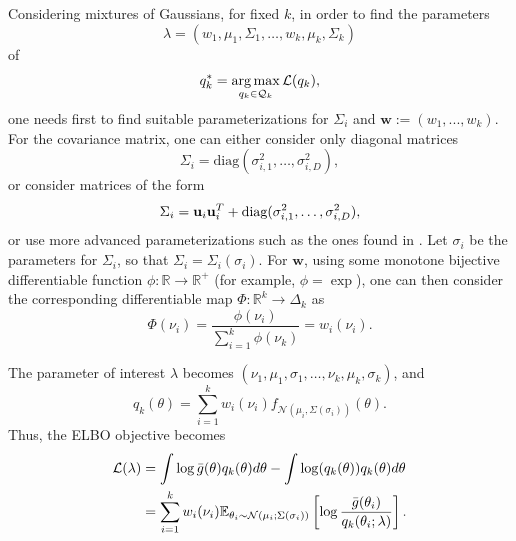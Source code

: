 Considering mixtures of Gaussians, for fixed $k$, in order to find the parameters
\begin{displaymath} 
\lambda = (w_1,\mu_1,\Sigma_1,\ldots,w_k,\mu_k,\Sigma_k)
\end{displaymath}
of 
\begin{equation}
 q^*_k = \operatorname*{arg\,max}_{q_k \in \mathcal{Q}_k} \mathcal{L}(q_k),
\end{equation}
one needs first to find suitable parameterizations for $\Sigma_i$ and $\mathbf{w} := (w_1,...,w_k)$. For the covariance matrix, one can either consider only diagonal matrices
\begin{equation}
\Sigma_i = \text{diag}(\sigma^2_{i,1},\ldots,\sigma^2_{i,D}),
\end{equation}
or consider matrices of the form
\begin{displaymath}
 \Sigma_i = {\mathbf u}_i {\mathbf u}_i^T + \text{diag}(\sigma^2_{i,1},\ldots,\sigma^2_{i,D}),
\end{displaymath}
or use more advanced parameterizations such as the ones found in \cite{Pinheiro_1996}. Let $\sigma_i$ be the parameters for $\Sigma_i$, so that $\Sigma_i = \Sigma_i(\sigma_i)$. For $\mathbf{w}$, using some monotone bijective differentiable function $\phi : \mathbb{R} \to \mathbb{R}^+$ (for example, $\phi = \exp$), one can then consider the corresponding differentiable map $\Phi : \mathbb{R}^k \to \Delta_k$ as 
\begin{equation}
\Phi(\nu_i) = \frac{\phi(\nu_i)}{\sum_{i=1}^k \phi(\nu_k)} = w_i(\nu_i).
\end{equation}

The parameter of interest $\lambda$ becomes $(\nu_1,\mu_1,\sigma_1,\ldots,\nu_k,\mu_k,\sigma_k)$, and
\begin{equation}
q_k(\theta) = \sum_{i=1}^k w_i(\nu_i) f_{\mathcal{N}(\mu_i,\Sigma(\sigma_i))}(\theta).
\end{equation}
Thus, the ELBO objective becomes
\begin{equation}\label{elbomixturegaussians}
\begin{split}
\mathcal{L}(\lambda) & = \int \log {\bar{g}}(\theta) q_k(\theta) d\theta - \int \log (q_k(\theta)) q_k(\theta) d \theta \\
& = \sum_{i=1}^k w_i(\nu_i) {\mathbb E}_{\theta_i \sim \mathcal{N}(\mu_i;\Sigma(\sigma_i))}\left[\log \frac{ {\bar{g}}(\theta_i)}{q_k(\theta_i;\lambda)}\right].
\end{split}
\end{equation}

